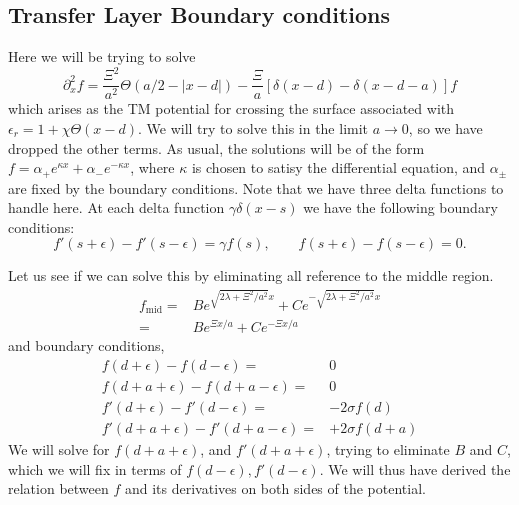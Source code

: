 \subsection{Transfer Layer Boundary conditions}

Here we will be trying to solve
\begin{equation}
\partial_x^2f =\frac{\Xi^2}{a^2}\Theta(a/2-|x-d|) - \frac{\Xi}{a}[\delta(x-d)-\delta(x-d-a)]f
\end{equation}
which arises as the TM potential for crossing the surface associated with $\epsilon_r = 1+\chi\Theta(x-d)$.  We will try to solve this in the limit $a\rightarrow 0$, so we have dropped the other terms.  
As usual, the solutions will be of the form $f = \alpha_+ e^{\kappa x}+\alpha_- e^{-\kappa x}$, where $\kappa$ is chosen to satisy the differential equation, and $\alpha_\pm$ are fixed by the boundary conditions.  Note that we have three delta functions to handle here.  At each delta function $\gamma \delta(x-s)$ we have the following boundary conditions:
\begin{equation}
f'(s+\epsilon)-f'(s-\epsilon) = \gamma f(s),\qquad f(s+\epsilon)-f(s-\epsilon) = 0.
\end{equation}

Let us see if we can solve this by eliminating all reference to the middle region.  
\begin{align}
f_{\text{mid}} =& Be^{\sqrt{2\lambda + \Xi^2/a^2}x} + C e^{-\sqrt{2\lambda + \Xi^2/a^2}x}\\
=& Be^{\Xi x/a} + C e^{-\Xi x/a}
\end{align}
and boundary conditions, 
\begin{subequations}
\begin{align}
f(d + \epsilon)-f(d -\epsilon) =& 0\\
f(d+a+\epsilon)- f(d+a-\epsilon)=& 0\\
f'(d + \epsilon) -f'(d -\epsilon)=& -2\sigma f(d)\\
f'(d+a+\epsilon) -f'(d+a-\epsilon)=& +2\sigma f(d+a)
\end{align}
\end{subequations}
We will solve for $f(d+a+\epsilon)$, and $f'(d+a+\epsilon)$, trying to eliminate $B$ and $C$, which we will fix in terms of $f(d-\epsilon),f'(d-\epsilon)$.  We will thus have derived the relation between $f$ and its derivatives on both sides of the potential.      

